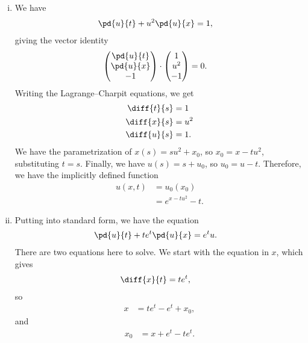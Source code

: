 \documentclass[10pt]{mypackage}
\begin{document}
\begin{solution}\hfill
  \begin{enumerate}[(i)]
    \item We have
      \begin{align*}
        \pd{u}{t} + u^2\pd{u}{x} &= 1,
      \end{align*}
      giving the vector identity
      \begin{align*}
        \begin{pmatrix}\pd{u}{t}\\\pd{u}{x}\\-1\end{pmatrix} \cdot \begin{pmatrix}1 \\ u^2 \\ -1\end{pmatrix} &= 0.
      \end{align*}
      Writing the Lagrange--Charpit equations, we get
      \begin{align*}
        \diff{t}{s} &= 1\\
        \diff{x}{s} &= u^2\\
        \diff{u}{s} &= 1.
      \end{align*}
      We have the parametrization of $x(s) = su^2 + x_0$, so $x_0 = x - tu^2$, substituting $t = s$. Finally, we have $u(s) = s + u_0$, so $u_0 = u - t$. Therefore, we have the implicitly defined function
      \begin{align*}
        u\left( x,t \right) &= u_0\left( x_0 \right)\\
                            &= e^{x-tu^2} - t.
      \end{align*}
    \item Putting into standard form, we have the equation
      \begin{align*}
        \pd{u}{t} + te^{t} \pd{u}{x} &= e^{t}u.
      \end{align*}
      There are two equations here to solve. We start with the equation in $x$, which gives
      \begin{align*}
        \diff{x}{t} &= te^{t},
      \end{align*}
      so
      \begin{align*}
        x &= te^{t}-e^{t} + x_0,
      \end{align*}
      and
      \begin{align*}
        x_0 &= x+e^{t}-te^{t}.
      \end{align*}

\end{enumerate}
\end{solution}
\end{document}
